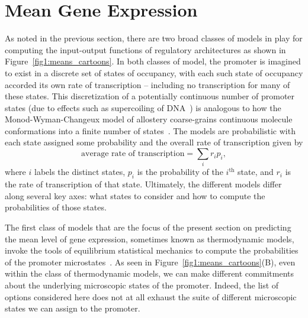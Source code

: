 \section{Mean Gene Expression}\label{section_02_means}

As noted in the previous section, there are two broad classes of models in play
for computing the input-output functions of regulatory architectures as shown in
Figure~\ref{fig1:means_cartoons}. In both classes of model, the promoter is
imagined to exist in a discrete set of states of occupancy, with each such state
of occupancy accorded its own rate of transcription -- including no 
transcription for many of these states. This discretization of a potentially
continuous number of promoter states (due to effects such as supercoiling of 
DNA~\cite{Chong2014, Sevier2016}) is analogous to how the Monod-Wyman-Changeux
model of allostery coarse-grains continuous molecule conformations into a finite
number of states~\cite{Martins2011}. The models are probabilistic with each
state assigned some probability and the overall rate of transcription given by 
\begin{equation}
\mbox{average rate of transcription} = \sum_i r_i p_i,
\label{eq:transcrip_prop_pbound}
\end{equation}
where $i$ labels the distinct states, $p_i$ is the probability of the
$i^{\text{th}}$ state, and $r_i$ is the rate of transcription of that state.
Ultimately, the different models differ along several key axes: what states to
consider and how to compute the probabilities of those states.

The first class of models that are the focus of the present section on
predicting the mean level of gene expression, sometimes known as thermodynamic
models, invoke the tools of equilibrium statistical mechanics to compute the
probabilities of the promoter microstates~\cite{Ackers1982, Shea1985,
Buchler2003, Vilar2003a, Vilar2003b, Bintu2005a, Bintu2005c, Gertz2009,
Sherman2012, Saiz2013}. As seen in Figure~\ref{fig1:means_cartoons}(B), even
within the class of thermodynamic models, we can make different commitments
about the underlying microscopic states of the promoter.  Indeed, the list of
options considered here does not at all exhaust the suite of different
microscopic states we can assign to the promoter.

